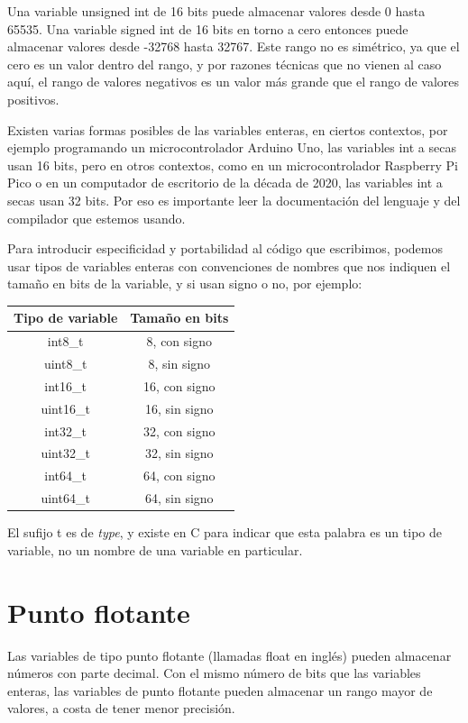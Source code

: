 \documentclass[../principal.tex]{subfiles}
\begin{document}
Una variable unsigned int de 16 bits puede almacenar valores desde 0 hasta 65535. Una variable signed int de 16 bits en torno a cero entonces puede almacenar valores desde -32768 hasta 32767. Este rango no es simétrico, ya que el cero es un valor dentro del rango, y por razones técnicas que no vienen al caso aquí, el rango de valores negativos es un valor más grande que el rango de valores positivos.

Existen varias formas posibles de las variables enteras, en ciertos contextos, por ejemplo programando un microcontrolador Arduino Uno, las variables int a secas usan 16 bits, pero en otros contextos, como en un microcontrolador Raspberry Pi Pico o en un computador de escritorio de la década de 2020, las variables int a secas usan 32 bits. Por eso es importante leer la documentación del lenguaje y del compilador que estemos usando.

Para introducir especificidad y portabilidad al código que escribimos, podemos usar tipos de variables enteras con convenciones de nombres que nos indiquen el tamaño en bits de la variable, y si usan signo o no, por ejemplo:

\begin{table}[H]
\begin{tabular}{c|c}
    \textbf{Tipo de variable} & \textbf{Tamaño en bits} \\
    \hline
    int8\_t & 8, con signo \\
    uint8\_t & 8, sin signo \\
    int16\_t & 16, con signo \\
    uint16\_t & 16, sin signo \\
    int32\_t & 32, con signo \\
    uint32\_t & 32, sin signo \\
    int64\_t & 64, con signo \\
    uint64\_t & 64, sin signo \\
\end{tabular}
\end{table}

El sufijo t es de \textit{type}, y existe en C para indicar que esta palabra es un tipo de variable, no un nombre de una variable en particular.

\section{Punto flotante}

Las variables de tipo punto flotante (llamadas float en inglés) pueden almacenar números con parte decimal. Con el mismo número de bits que las variables enteras, las variables de punto flotante pueden almacenar un rango mayor de valores, a costa de tener menor precisión.
\end{document}
